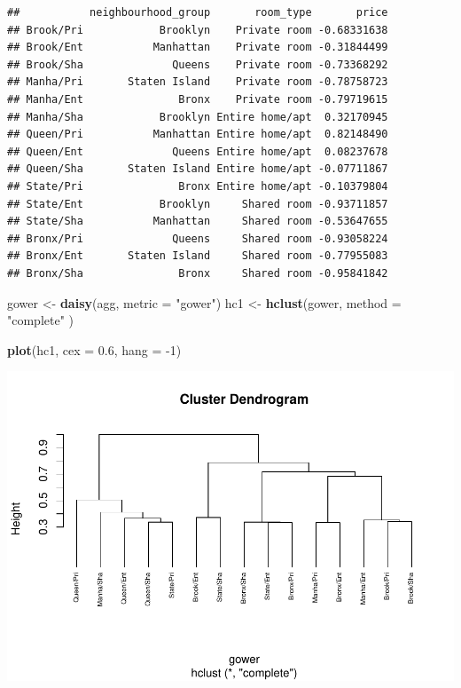 \documentclass[
]{article}
\newenvironment{Shaded}{\begin{snugshade}}{\end{snugshade}}
\newcommand{\DataTypeTok}[1]{\textcolor[rgb]{0.13,0.29,0.53}{#1}}
\newcommand{\DecValTok}[1]{\textcolor[rgb]{0.00,0.00,0.81}{#1}}
\newcommand{\FloatTok}[1]{\textcolor[rgb]{0.00,0.00,0.81}{#1}}
\newcommand{\KeywordTok}[1]{\textcolor[rgb]{0.13,0.29,0.53}{\textbf{#1}}}
\newcommand{\NormalTok}[1]{#1}
\newcommand{\StringTok}[1]{\textcolor[rgb]{0.31,0.60,0.02}{#1}}
\begin{document}
\begin{verbatim}
##           neighbourhood_group       room_type       price
## Brook/Pri            Brooklyn    Private room -0.68331638
## Brook/Ent           Manhattan    Private room -0.31844499
## Brook/Sha              Queens    Private room -0.73368292
## Manha/Pri       Staten Island    Private room -0.78758723
## Manha/Ent               Bronx    Private room -0.79719615
## Manha/Sha            Brooklyn Entire home/apt  0.32170945
## Queen/Pri           Manhattan Entire home/apt  0.82148490
## Queen/Ent              Queens Entire home/apt  0.08237678
## Queen/Sha       Staten Island Entire home/apt -0.07711867
## State/Pri               Bronx Entire home/apt -0.10379804
## State/Ent            Brooklyn     Shared room -0.93711857
## State/Sha           Manhattan     Shared room -0.53647655
## Bronx/Pri              Queens     Shared room -0.93058224
## Bronx/Ent       Staten Island     Shared room -0.77955083
## Bronx/Sha               Bronx     Shared room -0.95841842
\end{verbatim}

\begin{Shaded}
\begin{Highlighting}[]
\NormalTok{gower <-}\StringTok{ }\KeywordTok{daisy}\NormalTok{(agg, }\DataTypeTok{metric =} \StringTok{"gower"}\NormalTok{)}
\NormalTok{hc1 <-}\StringTok{ }\KeywordTok{hclust}\NormalTok{(gower, }\DataTypeTok{method =} \StringTok{"complete"}\NormalTok{ )}

\KeywordTok{plot}\NormalTok{(hc1, }\DataTypeTok{cex =} \FloatTok{0.6}\NormalTok{, }\DataTypeTok{hang =} \DecValTok{-1}\NormalTok{)}
\end{Highlighting}
\end{Shaded}

\includegraphics{project-code_files/figure-latex/unnamed-chunk-26-1.pdf}
\end{document}
